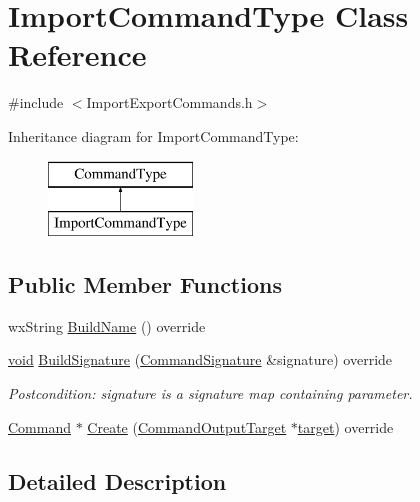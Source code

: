 \hypertarget{class_import_command_type}{}\section{Import\+Command\+Type Class Reference}
\label{class_import_command_type}


{\ttfamily \#include $<$Import\+Export\+Commands.\+h$>$}

Inheritance diagram for Import\+Command\+Type\+:\begin{figure}[H]
\begin{center}
\leavevmode
\includegraphics[height=2.000000cm]{class_import_command_type}
\end{center}
\end{figure}
\subsection*{Public Member Functions}
\begin{DoxyCompactItemize}
\item 
wx\+String \hyperlink{class_import_command_type_ae57f957205917b3a9fcae59ef2f978a2}{Build\+Name} () override
\item 
\hyperlink{sound_8c_ae35f5844602719cf66324f4de2a658b3}{void} \hyperlink{class_import_command_type_a292a4bdb15a363abffe97ec5c7a0468b}{Build\+Signature} (\hyperlink{class_command_signature}{Command\+Signature} \&signature) override
\begin{DoxyCompactList}\small\item\em Postcondition\+: signature is a \textquotesingle{}signature\textquotesingle{} map containing parameter. \end{DoxyCompactList}\item 
\hyperlink{class_command}{Command} $\ast$ \hyperlink{class_import_command_type_a1fefbf5da5f86503a2b86853aac72746}{Create} (\hyperlink{class_command_output_target}{Command\+Output\+Target} $\ast$\hyperlink{lib_2expat_8h_a15a257516a87decb971420e718853137}{target}) override
\end{DoxyCompactItemize}


\subsection{Detailed Description}


